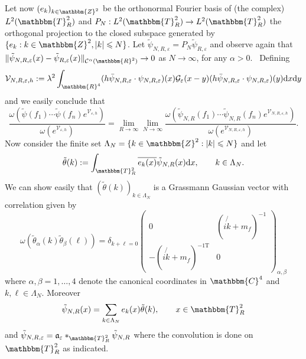\documentclass[11pt]{article}
\newcommand{\Tau}{\mathrm{T}}
\newcommand{\assign}{:=}
\newcommand{\mathd}{\mathrm{d}}
\begin{document}
Let now $(e_k)_{k \in \mathbbm{Z}^2}$ be the orthonormal Fourier basis of (the
complex) $L^2 (\mathbbm{T}_R^2)$ and $P_N : L^2 (\mathbbm{T}_R^2) \rightarrow
L^2 (\mathbbm{T}_R^2)$ the orthogonal projection to the closed subspace
generated by $\{ e_k : k \in \mathbbm{Z}^2, | k | \leqslant N \}$. Let
$\tilde{\psi}_{N, R, \varepsilon} = P_N \tilde{\psi}_{R, \varepsilon}$ and
observe again that $\| \tilde{\psi}_{N, R, \varepsilon} (x) - \tilde{\psi}_{R,
\varepsilon} (x) \|_{\mathcal{C}^{\alpha} (\mathbbm{R}^2)} \rightarrow 0$ as $N
\rightarrow \infty$, for any $\alpha > 0$. \ Defining
\[ \mathcal{V}_{N, R, \varepsilon, h} \assign \lambda^2 \int_{\mathbbm{R}^4} (h
   \bar{\psi}_{N, R, \varepsilon} \cdot \psi_{N, R, \varepsilon}) (x)
   \mathcal{G}_{\varepsilon} (x - y) (h \bar{\psi}_{N, R, \varepsilon} \cdot
   \psi_{N, R, \varepsilon}) (y) \mathd x \mathd y \]
and we easily conclude that
\begin{equation}
  \frac{\omega (\tilde{\psi} (f_1) \cdots \tilde{\psi} (f_n)
  e^{\mathcal{V}_{\varepsilon, h}})}{\omega (e^{\mathcal{V}_{\varepsilon,
  h}})} = \lim_{R \rightarrow \infty} \lim_{N \rightarrow \infty} \frac{\omega
  (\tilde{\psi}_{N, R} (f_1) \cdots \tilde{\psi}_{N, R} (f_n)
  e^{\mathcal{V}_{N, R, \varepsilon, h}})}{\omega (e^{\mathcal{V}_{N, R,
  \varepsilon, h}})} \label{eq:euclidean-yukawa-fermion-periodic-galerkin} .
\end{equation}
Now consider the finite set $\Lambda_N = \{ k \in \mathbbm{Z}^2 : | k |
\leqslant N \}$ and let
\[ \tilde{\theta} (k) \assign \int_{\mathbbm{T}_R^2} \overline{e_k (x)}
   \tilde{\psi}_{N, R} (x) \mathd x, \qquad k \in \Lambda_N . \]
We can show easily that $(\tilde{\theta} (k))_{k \in \Lambda_N}$ is a
Grassmann Gaussian vector with correlation given by
\begin{equation}
  \omega (\tilde{\theta}_{\alpha} (k) \tilde{\theta}_{\beta} (\ell)) =
  \delta_{k + \ell = 0} \left(\begin{array}{cc}
    0 & \left( i \not{k} + m_f \right)^{- 1}\\
    - \left( i \not{k} + m_f \right)^{- 1 \Tau} & 0
  \end{array}\right)_{\alpha, \beta}
  \label{eq:free-corrrelation-fourier-galerkin}
\end{equation}
where $\alpha, \beta = 1, \ldots, 4$ denote the canonical coordinates in
$\mathbbm{C}^4$ and $k, \ell \in \Lambda_N$. Moreover
\[ \tilde{\psi}_{N, R} (x) = \sum_{k \in \Lambda_N} e_k (x) \tilde{\theta}
   (k), \qquad x \in \mathbbm{T}^2_R \]
and $\tilde{\psi}_{N, R, \varepsilon} = \mathfrak{a}_{\varepsilon}
\ast_{\mathbbm{T}_R^2} \tilde{\psi}_{N, R}$ where the convolution is done on
$\mathbbm{T}^2_R$ as indicated.
\end{document}
